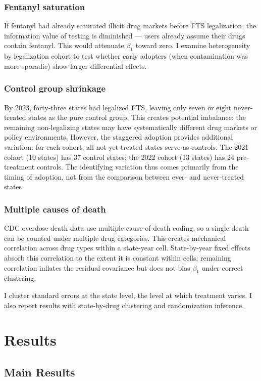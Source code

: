 \documentclass[12pt]{article}
\begin{document}
\subsubsection*{Fentanyl saturation}
If fentanyl had already saturated illicit drug markets before FTS legalization, the information value of testing is diminished --- users already assume their drugs contain fentanyl. This would attenuate $\beta_1$ toward zero. I examine heterogeneity by legalization cohort to test whether early adopters (when contamination was more sporadic) show larger differential effects.

\subsubsection*{Control group shrinkage}
By 2023, forty-three states had legalized FTS, leaving only seven or eight never-treated states as the pure control group. This creates potential imbalance: the remaining non-legalizing states may have systematically different drug markets or policy environments. However, the staggered adoption provides additional variation: for each cohort, all not-yet-treated states serve as controls. The 2021 cohort (10 states) has 37 control states; the 2022 cohort (13 states) has 24 pre-treatment controls. The identifying variation thus comes primarily from the timing of adoption, not from the comparison between ever- and never-treated states.

\subsubsection*{Multiple causes of death}
CDC overdose death data use multiple cause-of-death coding, so a single death can be counted under multiple drug categories. This creates mechanical correlation across drug types within a state-year cell. State-by-year fixed effects absorb this correlation to the extent it is constant within cells; remaining correlation inflates the residual covariance but does not bias $\beta_1$ under correct clustering.

I cluster standard errors at the state level, the level at which treatment varies. I also report results with state-by-drug clustering and randomization inference.

\section{Results}

\subsection{Main Results}
\end{document}
